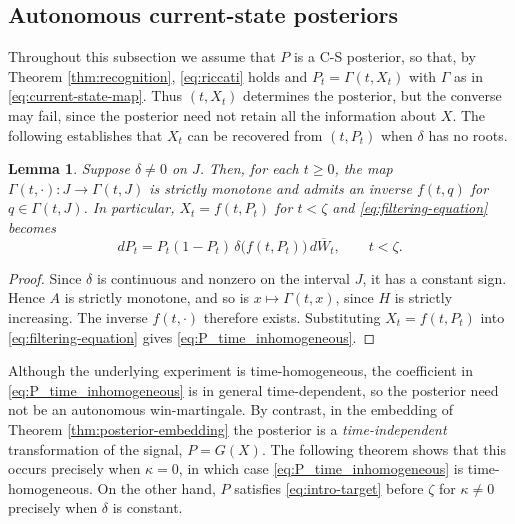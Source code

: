 \documentclass[11pt, reqno]{amsart}
\theoremstyle{plain}
\newtheorem{lemma}[theorem]{Lemma}
\theoremstyle{remark}
\numberwithin{equation}{section}
\begin{document}
%
%

%
%
%

%
%
%
%
%


\subsection{Autonomous current-state posteriors}
Throughout this subsection we assume that $P$ is a C-S posterior, so that, by
Theorem \ref{thm:recognition}, \eqref{eq:riccati} holds and $P_t=\Gamma(t,X_t)$
with $\Gamma$ as in \eqref{eq:current-state-map}. Thus $(t,X_t)$ determines the
posterior, but the converse may fail, since the posterior need not retain all the
information about $X$. The following establishes that $X_t$ can be recovered from $(t,P_t)$ when $\delta$ has no roots.

\begin{lemma}\label{lem:invertible-current-state}
Suppose $\delta\not=0$ on $J$. Then, for each $t\geq0$, the map
$\Gamma(t,\cdot):J\to\Gamma(t,J)$ is strictly monotone and admits an inverse $f(t,q)$ for $q\in\Gamma(t,J)$. In particular, $X_t=f(t,P_t)$ for $t<\zeta$ and \eqref{eq:filtering-equation} becomes
\begin{equation}\label{eq:P_time_inhomogeneous}
  dP_t=P_t(1-P_t)\,\delta\bigl(f(t,P_t)\bigr)\,d\overline W_t,
  \qquad t<\zeta.
\end{equation}
\end{lemma}

\begin{proof}
Since $\delta$ is continuous and nonzero on the interval $J$, it has a constant sign. Hence $A$ is strictly monotone, and so is \(x\mapsto \Gamma(t,x)\), since \(H\) is strictly increasing. The inverse \(f(t,\cdot)\) therefore exists. Substituting
\(X_t=f(t,P_t)\) into \eqref{eq:filtering-equation} gives
\eqref{eq:P_time_inhomogeneous}.
\end{proof}

Although the underlying experiment is time-homogeneous, the coefficient in
\eqref{eq:P_time_inhomogeneous} is in general time-dependent, so the posterior
need not be an autonomous win-martingale.
By contrast, in the embedding of Theorem \ref{thm:posterior-embedding} the
posterior is a \emph{time-independent} transformation of the signal, $P=G(X)$.
The following theorem shows that this occurs precisely when $\kappa=0$, in which
case \eqref{eq:P_time_inhomogeneous} is time-homogeneous. On the other hand,
$P$ satisfies \eqref{eq:intro-target} before $\zeta$ for $\kappa\neq0$ precisely when $\delta$ is constant.
\end{document}
